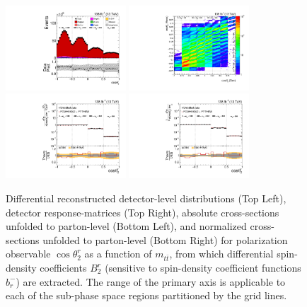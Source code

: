 \clearpage
\begin{figure}[htb]
\begin{center}
 \includegraphics[width=0.40\textwidth]{fig_fullRun2UL/controlplots/combined/Hyp_LeptonBr_vs_TTBarMass.pdf}
 \includegraphics[width=0.40\textwidth]{fig_fullRun2UL/unfolding/combined/ResponseMatrix_b2r_mttbar.pdf} \\
 \includegraphics[width=0.40\textwidth]{fig_fullRun2UL/unfolding/combined/UnfoldedResults_b2r_mttbar.pdf}
 \includegraphics[width=0.40\textwidth]{fig_fullRun2UL/unfolding/combined/UnfoldedResultsNorm_b2r_mttbar.pdf} \\
\label{fig:b2r_mttbar}
\caption{Differential reconstructed detector-level distributions (Top Left), detector response-matrices (Top Right), absolute cross-sections unfolded to parton-level (Bottom Left), and normalized cross-sections unfolded to parton-level (Bottom Right) for polarization observable $\cos\theta_{2}^{r}$ as a function of $m_{t\bar{t}}$, from which differential spin-density coefficients $B_{2}^{r}$ (sensitive to spin-density coefficient functions $b_r^{-}$) are extracted.  The range of the primary axis is applicable to each of the sub-phase space regions partitioned by the grid lines.}
\end{center}
\end{figure}
